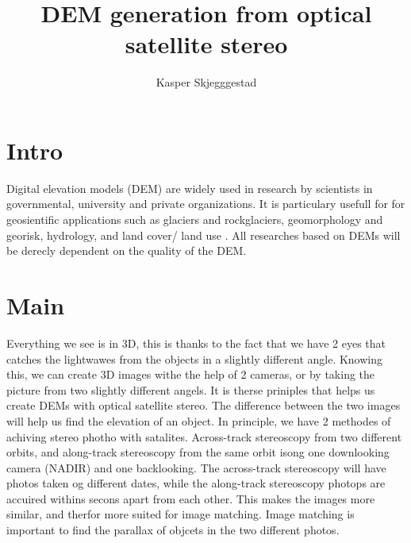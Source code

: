 \documentclass[a4paper,UKenglish]{article}
\title{DEM generation from optical satellite stereo}
\author{Kasper Skjegggestad}
\begin{document}
\maketitle
\tableofcontents

\section{Intro}

Digital elevation models (DEM) are widely used in research by scientists in governmental, university and private organizations. It is particulary usefull for for geosientific applications such as glaciers and rockglaciers, geomorphology and georisk, hydrology, and land cover/ land use \citep{toutin08}. All researches based on DEMs will be derecly dependent on the quality of the DEM.

\section{Main}

Everything we see is in 3D, this is thanks to the fact that we have 2 eyes that catches the lightwawes from the objects in a slightly different angle. Knowing this, we can create 3D images withe the help of 2 cameras, or by taking the picture from two slightly different angels. It is therse priniples that helps us create DEMs with optical satellite stereo. The difference between the two images will help us find the elevation of an object. In principle, we have 2 methodes of achiving stereo photho with satalites. Across-track stereoscopy from two different orbits, and along-track stereoscopy from the same orbit isong one downlooking camera (NADIR) and one backlooking. The across-track stereoscopy will have photos taken og different dates, while the along-track stereoscopy photops are accuired withins secons apart from each other. This makes the images more similar, and therfor more suited for image matching. Image matching is important to find the parallax of objcets in the two different photos. 



\end{document}
